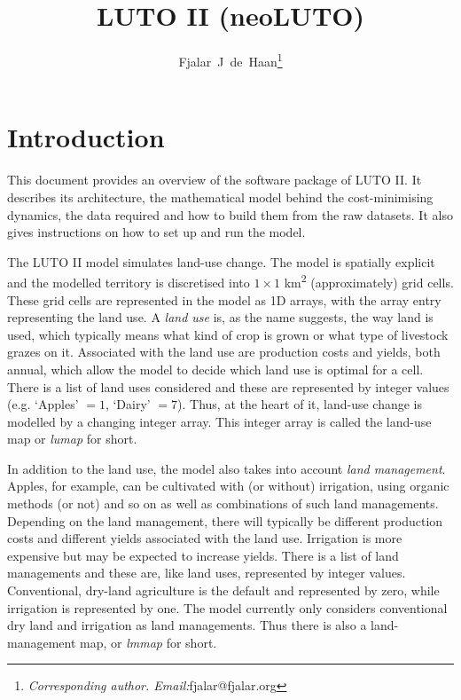 \documentclass[12pt,a4paper,twoside]{article}
\author[]{Fjalar~J~de~Haan\thanks{\textit{Corresponding author. Email:}fjalar@fjalar.org}}
\affil[]{Planet A, Centre for Integrative Ecology, \mbox{Deakin University, Australia}}
\date{}
\begin{document}
\title{LUTO II (neoLUTO)}

\maketitle

\tableofcontents

\newpage

\section{Introduction}
This document provides an overview of the software package of LUTO II\@. It describes its architecture, the mathematical model behind the cost-minimising dynamics, the data required and how to build them from the raw datasets. It also gives instructions on how to set up and run the model.


The LUTO II model simulates land-use change. The model is spatially explicit and the modelled territory is discretised into $1 \times 1$ km\textsuperscript{2} (approximately) grid cells. These grid cells are represented in the model as 1D arrays, with the array entry representing the land use. A \emph{land use} is, as the name suggests, the way land is used, which typically means what kind of crop is grown or what type of livestock grazes on it. Associated with the land use are production costs and yields, both annual, which allow the model to decide which land use is optimal for a cell. There is a list of land uses considered and these are represented by integer values (e.g. `Apples' $ = 1$, `Dairy' $ = 7$). Thus, at the heart of it, land-use change is modelled by a changing integer array. This integer array is called the land-use map or \emph{lumap} for short.

In addition to the land use, the model also takes into account \emph{land management}. Apples, for example, can be cultivated with (or without) irrigation, using organic methods (or not) and so on as well as combinations of such land managements. Depending on the land management, there will typically be different production costs and different yields associated with the land use. Irrigation is more expensive but may be expected to increase yields. There is a list of land managements and these are, like land uses, represented by integer values. Conventional, dry-land agriculture is the default and represented by zero, while irrigation is represented by one. The model currently only considers conventional dry land and irrigation as land managements. Thus there is also a land-management map, or \emph{lmmap} for short.
\end{document}
